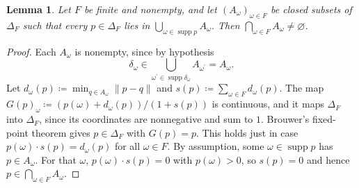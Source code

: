\documentclass[11pt]{article}
\newtheorem{lemma}[theorem]{Lemma}
\theoremstyle{definition}
\theoremstyle{remark}
\newcommand{\supp}{\operatorname{supp}}
\begin{document}
\begin{lemma}\label{lem:kkm}
Let $F$ be finite and nonempty, and let $(A_\omega)_{\omega\in F}$ be closed subsets of $\Delta_F$ such that every $p\in\Delta_F$ lies in $\bigcup_{\omega\in\supp p}A_\omega$. Then $\bigcap_{\omega\in F}A_\omega\ne\varnothing$.
\end{lemma}
\begin{proof}
Each $A_\omega$ is nonempty, since by hypothesis
\[
\delta_\omega\in\bigcup_{\omega^\prime\in\supp \delta_\omega}A_{\omega^\prime}=A_\omega.
\]
Let $d_\omega(p)\coloneqq \min_{q\in A_\omega}\lVert p-q \rVert$ and $s(p)\coloneqq \sum_{\omega\in F} d_\omega(p)$. The map $G(p)_\omega\coloneqq (p(\omega)+d_\omega(p))/(1+s(p))$ is continuous, and it maps $\Delta_F$ into $\Delta_F$, since its coordinates are nonnegative and sum to $1$. Brouwer's fixed-point theorem gives $p\in\Delta_F$ with $G(p)=p$. This holds just in case $p(\omega)\cdot s(p)=d_\omega(p)$ for all $\omega\in F$. By assumption, some $\omega\in\supp p$ has $p\in A_\omega$. For that $\omega$, $p(\omega)\cdot s(p)=0$ with $p(\omega)>0$, so $s(p)=0$ and hence $p\in\bigcap_{\omega\in F}A_\omega$.
\end{proof}
\end{document}
